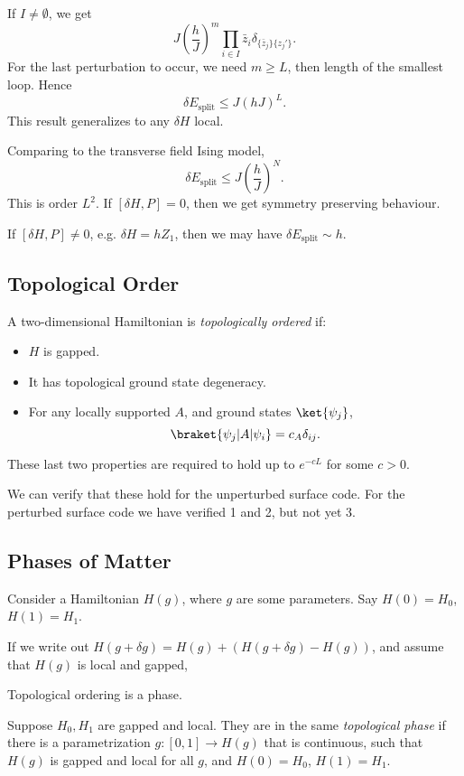 \documentclass[12pt]{article}
\begin{document}
If $I \neq \emptyset$, we get
\[
	J \left( \frac hJ \right)^{m} \prod_{i \in I} \bar z_i \delta_{\{\bar z_j\} \{z_j'\}}.
\]
For the last perturbation to occur, we need $m \geq L$, then length of the smallest loop. Hence
\[
\delta E_{\mathrm{split}} \leq J \left( hJ \right)^{L}.
\]
This result generalizes to any $\delta H$ local.

Comparing to the transverse field Ising model,
\[
\delta E_{\mathrm{split}} \leq J \left( \frac hJ\right)^{N}.
\]
This is order $L^2$. If $[\delta H, P] = 0$, then we get symmetry preserving behaviour.

If $[\delta H, P] \neq 0$, e.g. $\delta H = h Z_1$, then we may have $\delta E_{\mathrm{split}} \sim h$.

\subsection{Topological Order}%
\label{sub:to}

A two-dimensional Hamiltonian is \emph{topologically ordered} if:
\begin{itemize}
	\item $H$ is gapped.
	\item It has topological ground state degeneracy.
	\item For any locally supported $A$, and ground states $\ket{\psi_j}$,
		\[
			\braket{\psi_j|A|\psi_i} = c_A \delta_{ij}.
		\]
\end{itemize}
These last two properties are required to hold up to $e^{-c L}$ for some $c > 0$.

We can verify that these hold for the unperturbed surface code. For the perturbed surface code we have verified 1 and 2, but not yet 3.

\subsection{Phases of Matter}%
\label{sub:pm}

Consider a Hamiltonian $H(g)$, where $g$ are some parameters. Say $H(0) = H_0$, $H(1) = H_1$.

If we write out $H(g + \delta g) = H(g) + (H(g + \delta g) - H(g))$, and assume that $H(g)$ is local and gapped,

Topological ordering is a phase.

\begin{definition}
	Suppose $H_0, H_1$ are gapped and local. They are in the same \emph{topological phase} if there is a parametrization $g : [0, 1] \to H(g)$ that is continuous, such that $H(g)$ is gapped and local for all $g$, and $H(0) =H_0$, $H(1) = H_1$.
\end{definition}
\end{document}
